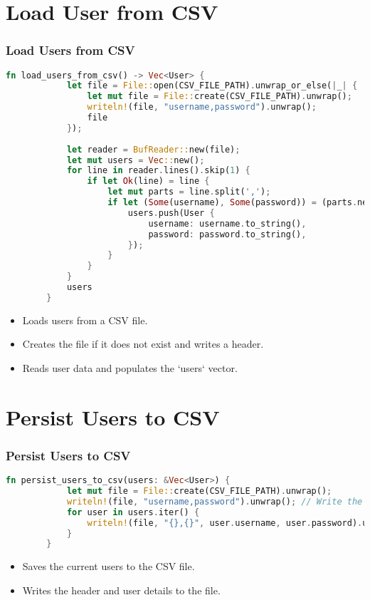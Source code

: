 \documentclass[aspectratio=169, table]{beamer}
\begin{document}
\section{Load User from CSV}
\begin{frame}[fragile]
	\frametitle{Load Users from CSV}
	\begin{lstlisting}[language=Rust]
		fn load_users_from_csv() -> Vec<User> {
			let file = File::open(CSV_FILE_PATH).unwrap_or_else(|_| {
				let mut file = File::create(CSV_FILE_PATH).unwrap();
				writeln!(file, "username,password").unwrap();
				file
			});
			
			let reader = BufReader::new(file);
			let mut users = Vec::new();
			for line in reader.lines().skip(1) {
				if let Ok(line) = line {
					let mut parts = line.split(',');
					if let (Some(username), Some(password)) = (parts.next(), parts.next()) {
						users.push(User {
							username: username.to_string(),
							password: password.to_string(),
						});
					}
				}
			}
			users
		}
	\end{lstlisting}
	\begin{itemize}
		\item Loads users from a CSV file.
		\item Creates the file if it does not exist and writes a header.
		\item Reads user data and populates the `users` vector.
	\end{itemize}
\end{frame}


\section{Persist Users to CSV}
\begin{frame}[fragile]
	\frametitle{Persist Users to CSV}
	\begin{lstlisting}[language=Rust]
		fn persist_users_to_csv(users: &Vec<User>) {
			let mut file = File::create(CSV_FILE_PATH).unwrap();
			writeln!(file, "username,password").unwrap(); // Write the header
			for user in users.iter() {
				writeln!(file, "{},{}", user.username, user.password).unwrap();
			}
		}
	\end{lstlisting}
	\begin{itemize}
		\item Saves the current users to the CSV file.
		\item Writes the header and user details to the file.
	\end{itemize}
\end{frame}
\end{document}
